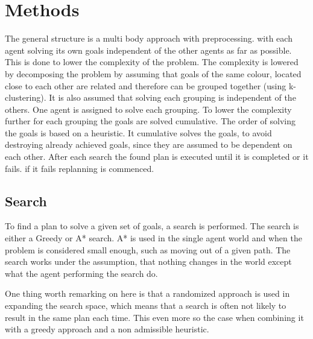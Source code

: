 \documentclass[letterpaper]{article}
\begin{document}
\section{Methods}
%		
%		
%		
		The general structure is a multi body approach with preprocessing. with each agent solving its own goals independent of the other agents as far as possible. This is done to lower the complexity of the problem. The complexity is lowered by decomposing the problem by assuming that goals of the same colour, located close to each other are related and therefore can be grouped together (using k-clustering). It is also assumed that solving each grouping is independent of the others. One agent is assigned to solve each grouping. 
		To lower the complexity further for each grouping the goals are solved cumulative. The order of solving the goals is based on a heuristic. It cumulative solves the goals, to avoid destroying already achieved goals, since they are assumed to be dependent on each other. After each search the found plan is executed until it is completed or it fails. if it fails replanning is commenced.

 
				
	\subsection{Search}
		To find a plan to solve a given set of goals, a search is performed. The search is either a Greedy or A* search. A* is used in the single agent world and when the problem is considered small enough, such as moving out of a given path. 
		The search works under the assumption, that nothing changes in the world except what the agent performing the search do.
		
		One thing worth remarking on here is that a randomized approach is used in expanding the search space, which means that a search is often not likely to result in the same plan each time. This even more so the case when combining it with a greedy approach and a non admissible heuristic.
\end{document}
